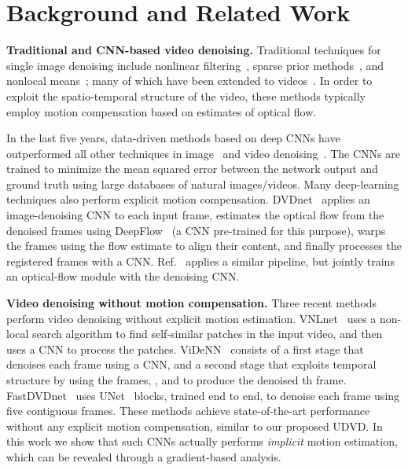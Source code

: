 \documentclass[final]{cvpr}
\begin{document}
\section{Background and Related Work}
\label{sec:related_work}


\noindent \textbf{Traditional and CNN-based video denoising.} Traditional techniques for single image denoising include nonlinear filtering~\cite{tomasi1998bilateral,milanfar2012tour}, sparse prior methods~\cite{ksvd,donoho1995,simoncelli1996,
chang2000adaptive,portilla2003image,bm3d}, and nonlocal means~\cite{nlb}; many of which have been extended to videos~\cite{liu2010high,arias2018video,vbm4d,buades2016patch}.
In order to exploit the spatio-temporal structure of 
the video, these methods typically employ motion compensation based on estimates of 
optical flow. 

In the last five years, data-driven methods based on deep CNNs \cite{lecun2015deep} have outperformed all other techniques in image~\cite{dncnn, cbdnet, chen2016trainable} and video denoising~\cite{dvdnet,xue2019video,fastdvdnet,rawvideo}. The CNNs are trained to minimize the mean squared error between the network output and ground truth using large databases of natural images/videos. Many deep-learning techniques also perform explicit motion compensation. DVDnet~\cite{dvdnet} applies an image-denoising CNN to each input frame, estimates the optical flow from the denoised frames using DeepFlow~\cite{deepflow} (a CNN pre-trained for this purpose), warps the frames using the flow estimate to align their content, and finally processes the registered frames with a CNN. 
Ref.~\cite{xue2019video} applies a similar pipeline, but jointly trains an optical-flow module with the denoising CNN.

\noindent \textbf{Video denoising without motion compensation.} Three recent methods perform video denoising without explicit motion estimation.  VNLnet~\cite{vnlnet} uses a non-local search algorithm to find self-similar patches in the input video, and then uses a CNN to process the patches. ViDeNN~\cite{videnn} consists of a first stage that denoises each frame using a CNN, and a second stage that exploits temporal structure by using the frames, ,  and  to produce the denoised th frame. FastDVDnet~\cite{fastdvdnet} uses UNet~\cite{ronneberger2015u} blocks, trained end to end, to denoise each frame using five contiguous frames. These methods achieve state-of-the-art performance without any explicit motion compensation, similar to our proposed UDVD. In this work we show that such CNNs actually performs \emph{implicit} motion estimation, which can be revealed through a gradient-based analysis.
\end{document}
